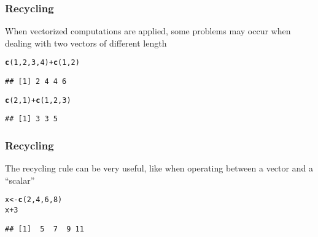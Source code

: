 \documentclass[12pt]{beamer}\usepackage[]{graphicx}\usepackage[]{color}
\makeatletter
\newcommand{\hlnum}[1]{\textcolor[rgb]{0.686,0.059,0.569}{#1}}%
\newcommand{\hlopt}[1]{\textcolor[rgb]{0,0,0}{#1}}%
\newcommand{\hlstd}[1]{\textcolor[rgb]{0.345,0.345,0.345}{#1}}%
\newcommand{\hlkwb}[1]{\textcolor[rgb]{0.69,0.353,0.396}{#1}}%
\newcommand{\hlkwd}[1]{\textcolor[rgb]{0.737,0.353,0.396}{\textbf{#1}}}%
\newenvironment{kframe}{%
 \def\at@end@of@kframe{}%
 \ifinner\ifhmode%
  \def\at@end@of@kframe{\end{minipage}}%
  \begin{minipage}{\columnwidth}%
 \fi\fi%
 \def\FrameCommand##1{\hskip\@totalleftmargin \hskip-\fboxsep
 \colorbox{shadecolor}{##1}\hskip-\fboxsep
     \hskip-\linewidth \hskip-\@totalleftmargin \hskip\columnwidth}%
 \MakeFramed {\advance\hsize-\width
   \@totalleftmargin\z@ \linewidth\hsize
   \@setminipage}}%
 {\par\unskip\endMakeFramed%
 \at@end@of@kframe}
\newenvironment{knitrout}{}{} %
\makeatother
\begin{document}
\begin{frame}[fragile]
\frametitle{Recycling}

When vectorized computations are applied, some problems may occur 
when dealing with two vectors of different length

\begin{knitrout}\footnotesize
{}\color{fgcolor}\begin{kframe}
\begin{alltt}
\hlkwd{c}\hlstd{(}\hlnum{1}\hlstd{,} \hlnum{2}\hlstd{,} \hlnum{3}\hlstd{,} \hlnum{4}\hlstd{)} \hlopt{+} \hlkwd{c}\hlstd{(}\hlnum{1}\hlstd{,} \hlnum{2}\hlstd{)}
\end{alltt}
\begin{verbatim}
## [1] 2 4 4 6
\end{verbatim}
\begin{alltt}
\hlkwd{c}\hlstd{(}\hlnum{2}\hlstd{,} \hlnum{1}\hlstd{)} \hlopt{+} \hlkwd{c}\hlstd{(}\hlnum{1}\hlstd{,} \hlnum{2}\hlstd{,} \hlnum{3}\hlstd{)}
\end{alltt}


{\ttfamily\noindent\color{warningcolor}{\#\# Warning in c(2, 1) + c(1, 2, 3): longer object length is not a multiple of shorter object length}}\begin{verbatim}
## [1] 3 3 5
\end{verbatim}
\end{kframe}
\end{knitrout}

\end{frame}


\begin{frame}[fragile]
\frametitle{Recycling}

The recycling rule can be very useful, like when operating between a vector and a ``scalar''

\begin{knitrout}\footnotesize
{}\color{fgcolor}\begin{kframe}
\begin{alltt}
\hlstd{x} \hlkwb{<-} \hlkwd{c}\hlstd{(}\hlnum{2}\hlstd{,} \hlnum{4}\hlstd{,} \hlnum{6}\hlstd{,} \hlnum{8}\hlstd{)}
\hlstd{x} \hlopt{+} \hlnum{3}
\end{alltt}
\begin{verbatim}
## [1]  5  7  9 11
\end{verbatim}
\end{kframe}
\end{knitrout}

\end{frame}
\end{document}
